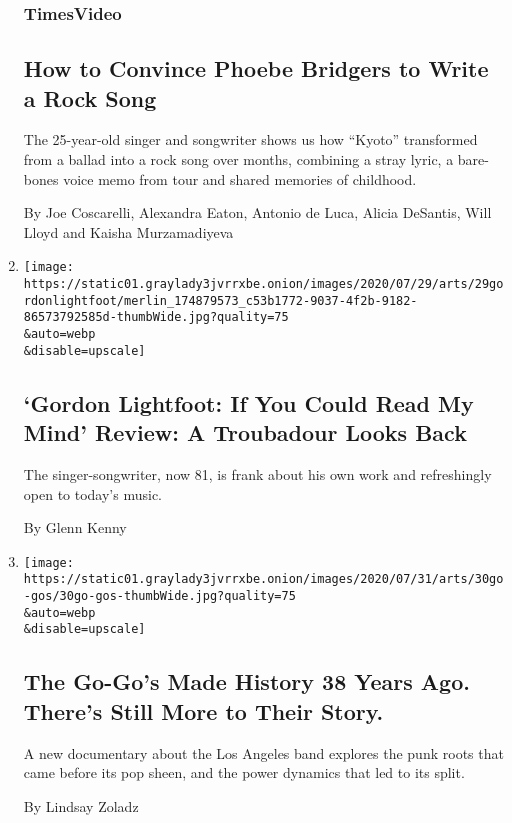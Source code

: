 \begin{enumerate}
  \hypertarget{timesvideo}{%
  \subsubsection{TimesVideo}\label{timesvideo}}

  \hypertarget{how-to-convince-phoebe-bridgers-to-write-a-rock-song}{%
  \subsection{How to Convince Phoebe Bridgers to Write a Rock
  Song}\label{how-to-convince-phoebe-bridgers-to-write-a-rock-song}}

  The 25-year-old singer and songwriter shows us how ``Kyoto''
  transformed from a ballad into a rock song over months, combining a
  stray lyric, a bare-bones voice memo from tour and shared memories of
  childhood.

  By Joe Coscarelli, Alexandra Eaton, Antonio de Luca, Alicia DeSantis,
  Will Lloyd and Kaisha Murzamadiyeva
\item
  \href{/2020/07/29/movies/gordon-lightfoot-if-you-could-read-my-mind-review.html}{}

  \texttt{[image: https://static01.graylady3jvrrxbe.onion/images/2020/07/29/arts/29gordonlightfoot/merlin\_174879573\_c53b1772-9037-4f2b-9182-86573792585d-thumbWide.jpg?quality=75\\\&auto=webp\\\&disable=upscale]}

  \hypertarget{gordon-lightfoot-if-you-could-read-my-mind-review-a-troubadour-looks-back}{%
  \subsection{`Gordon Lightfoot: If You Could Read My Mind' Review: A
  Troubadour Looks
  Back}\label{gordon-lightfoot-if-you-could-read-my-mind-review-a-troubadour-looks-back}}

  The singer-songwriter, now 81, is frank about his own work and
  refreshingly open to today's music.

  By Glenn Kenny
\item
  \href{/2020/07/29/arts/music/the-go-gos-documentary.html}{}

  \texttt{[image: https://static01.graylady3jvrrxbe.onion/images/2020/07/31/arts/30go-gos/30go-gos-thumbWide.jpg?quality=75\\\&auto=webp\\\&disable=upscale]}

  \hypertarget{the-go-gos-made-history-38-years-ago-theres-still-more-to-their-story}{%
  \subsection{The Go-Go's Made History 38 Years Ago. There's Still More
  to Their
  Story.}\label{the-go-gos-made-history-38-years-ago-theres-still-more-to-their-story}}

  A new documentary about the Los Angeles band explores the punk roots
  that came before its pop sheen, and the power dynamics that led to its
  split.

  By Lindsay Zoladz
\end{enumerate}

